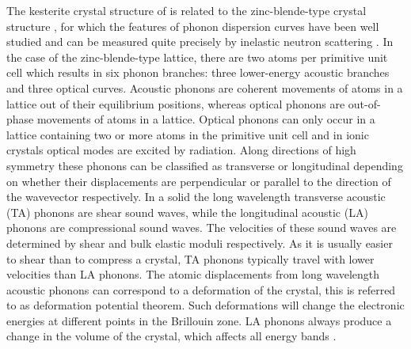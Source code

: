 The kesterite crystal structure of {\CZTS} is related to the zinc-blende-type crystal structure \cite{Aron_zinc_blende}, for which the features of phonon dispersion curves have been well studied and can be measured quite precisely by inelastic neutron scattering \cite{fund_semi}. In the case of the zinc-blende-type lattice, there are two atoms per primitive unit cell which results in six phonon branches: three lower-energy acoustic branches and three optical curves. Acoustic phonons are coherent movements of atoms in a lattice out of their equilibrium positions, whereas optical phonons are out-of-phase movements of atoms in a lattice. Optical phonons can only occur in a lattice containing two or more atoms in the primitive unit cell and in ionic crystals optical modes are excited by radiation.  Along directions of high symmetry these phonons can be classified as transverse or longitudinal depending on whether their displacements are perpendicular or parallel to the direction of the wavevector respectively. In a solid the long wavelength transverse acoustic (TA) phonons are shear sound waves, while the longitudinal acoustic (LA) phonons are compressional sound waves. The velocities of these sound waves are determined by shear and bulk elastic moduli respectively. As it is usually easier to shear than to compress a crystal, TA phonons typically travel with lower velocities than LA phonons.  
The atomic displacements from long wavelength acoustic phonons can correspond to a deformation of the crystal, this is referred to as deformation potential theorem. Such deformations will change the electronic energies at different points in the Brillouin zone. LA phonons always produce a change in the volume of the crystal, which affects all energy bands \cite{fund_semi}.\\

